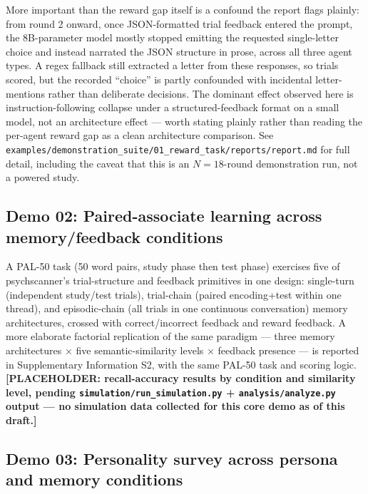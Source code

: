 \documentclass[11pt]{article}
\begin{document}
More important than the reward gap itself is a confound the report flags
plainly: from round 2 onward, once JSON-formatted trial feedback entered the
prompt, the 8B-parameter model mostly stopped emitting the requested
single-letter choice and instead narrated the JSON structure in prose,
across all three agent types. A regex fallback still extracted a letter from
these responses, so trials scored, but the recorded ``choice'' is partly
confounded with incidental letter-mentions rather than deliberate decisions.
The dominant effect observed here is instruction-following collapse under a
structured-feedback format on a small model, not an architecture effect ---
worth stating plainly rather than reading the per-agent reward gap as a
clean architecture comparison. See
\texttt{examples/demonstration\_suite/01\_reward\_task/reports/report.md} for full detail,
including the caveat that this is an $N{=}18$-round demonstration run, not a
powered study.

\subsection{Demo 02: Paired-associate learning across memory/feedback conditions}
\label{sec:demo02}

A PAL-50 task (50 word pairs, study phase then test phase) exercises five
of psychscanner's trial-structure and feedback primitives in one design:
single-turn (independent study/test trials), trial-chain (paired
encoding+test within one thread), and episodic-chain (all trials in one
continuous conversation) memory architectures, crossed with
correct/incorrect feedback and reward feedback. A more elaborate factorial
replication of the same paradigm — three memory architectures $\times$ five
semantic-similarity levels $\times$ feedback presence — is reported in
Supplementary Information S2, with the same PAL-50 task and scoring logic.
\textbf{[PLACEHOLDER: recall-accuracy results by condition and similarity
level, pending \texttt{simulation/run\_simulation.py} +
\texttt{analysis/analyze.py} output — no simulation data collected for this
core demo as of this draft.]}

\subsection{Demo 03: Personality survey across persona and memory conditions}
\label{sec:demo03}
\end{document}
